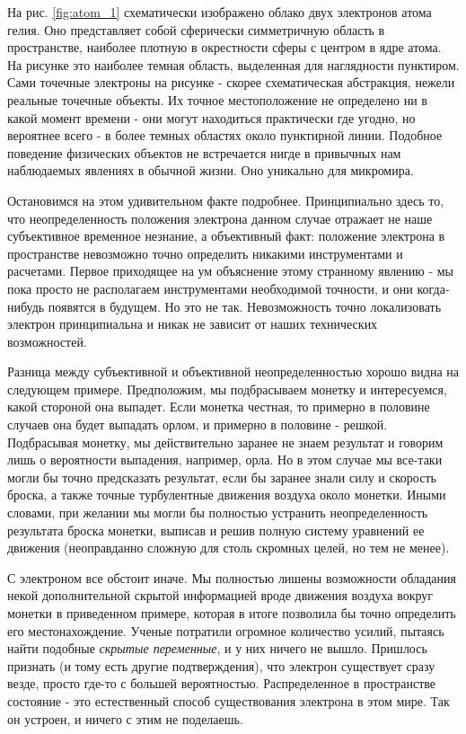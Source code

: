 На рис. \ref{fig:atom_1} схематически изображено облако двух электронов атома гелия.
Оно представляет собой сферически симметричную область в пространстве, наиболее плотную в окрестности сферы с центром в ядре атома.
На рисунке это наиболее темная область, выделенная для наглядности пунктиром.
Сами точечные электроны на рисунке - скорее схематическая абстракция, нежели реальные точечные объекты.
Их точное местоположение не определено ни в какой момент времени - они могут находиться практически где угодно, но вероятнее всего - в более темных областях около пунктирной линии.
Подобное поведение физических объектов не встречается нигде в привычных нам наблюдаемых явлениях в обычной жизни.
Оно уникально для микромира. 

Остановимся на этом удивительном факте подробнее.
Принципиально здесь то, что неопределенность положения электрона данном случае отражает не наше субъективное временное незнание, а объективный факт: положение электрона в пространстве невозможно точно определить никакими инструментами и расчетами.
Первое приходящее на ум объяснение этому странному явлению - мы пока просто не располагаем инструментами необходимой точности, и они когда-нибудь появятся в будущем.
Но это не так.
Невозможность точно локализовать электрон принципиальна и никак не зависит от наших технических возможностей.

Разница между субъективной и объективной неопределенностью хорошо видна на следующем примере.
Предположим, мы подбрасываем монетку и интересуемся, какой стороной она выпадет.
Если монетка честная, то примерно в половине случаев она будет выпадать орлом, и примерно в половине - решкой.
Подбрасывая монетку, мы действительно заранее не знаем результат и говорим лишь о вероятности выпадения, например, орла.
Но в этом случае мы все-таки могли бы точно предсказать результат, если бы заранее знали силу и скорость броска, а также точные турбулентные движения воздуха около монетки.
Иными словами, при желании мы могли бы полностью устранить неопределенность результата броска монетки, выписав и решив полную систему уравнений ее движения (неоправданно сложную для столь скромных целей, но тем не менее). 

С электроном все обстоит иначе.
Мы полностью лишены возможности обладания некой дополнительной скрытой информацией вроде движения воздуха вокруг монетки в приведенном примере, которая в итоге позволила бы точно определить его местонахождение.
Ученые потратили огромное количество усилий, пытаясь найти подобные \textit{скрытые переменные}, и у них ничего не вышло.
Пришлось признать (и тому есть другие подтверждения), что электрон существует сразу везде, просто где-то с большей вероятностью. 
Распределенное в пространстве состояние - это естественный способ существования электрона в этом мире.
Так он устроен, и ничего с этим не поделаешь. 

